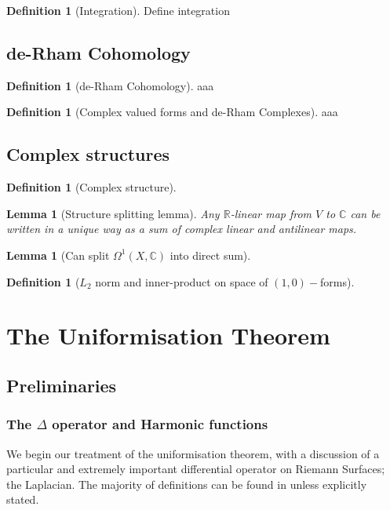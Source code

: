 \documentclass[a4paper,12pt]{report}
\theoremstyle{plain}
\newtheorem{lemma}[thm]{Lemma}
\theoremstyle{definition}
\newtheorem{defn}[thm]{Definition}
\begin{document}
\begin{defn}[Integration]\label{Integration}
  Define integration 
\end{defn}

\section{de-Rham Cohomology}

\begin{defn}[de-Rham Cohomology]\label{deRham}
  aaa
\end{defn}

\begin{defn}[Complex valued forms and de-Rham Complexes]\label{Cforms}
  aaa
\end{defn}

\section{Complex structures}

\begin{defn}[Complex structure]\label{Cstructure}
  
\end{defn}

\begin{lemma}[Structure splitting lemma]
  Any $\mathbb{R}$-linear map from $V$ to $\mathbb{C}$ can be written in a unique way as a sum of complex linear and antilinear maps.
\end{lemma}

\begin{lemma}[Can split $\Omega^1(X,\mathbb{C})$ into direct sum]
  
\end{lemma}

\begin{defn}[$L_2$ norm and inner-product on space of $(1,0)-$forms]\label{InnerProduct}
  
\end{defn}
\chapter{The Uniformisation Theorem}
\section{Preliminaries}
\subsection{The $\Delta$ operator and Harmonic functions}
We begin our treatment of the uniformisation theorem, with a discussion of a particular and extremely important differential operator on Riemann Surfaces; the Laplacian. The majority of definitions can be found in \cite{donaldson} unless explicitly stated.
\end{document}
